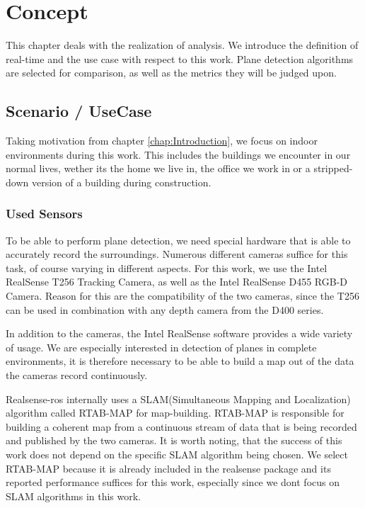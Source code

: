 \documentclass[main.tex]{subfiles}
\begin{document}
\chapter{Concept} \label{chap:Concept}


This chapter deals with the realization of analysis.
We introduce the definition of real-time and the use case with respect to this work.
Plane detection algorithms are selected for comparison, as well as the metrics they will be judged upon.

\section{Scenario / UseCase}
Taking motivation from chapter \ref{chap:Introduction}, we focus on indoor environments during this work.
This includes the buildings we encounter in our normal lives, wether its the home we live in, the office we work in or a stripped-down
version of a building during construction.


\subsection{Used Sensors}
To be able to perform plane detection, we need special hardware that is able to accurately record the surroundings.
Numerous different cameras suffice for this task, of course varying in different aspects.
For this work, we use the Intel RealSense T256 Tracking Camera, as well as the Intel RealSense D455 RGB-D Camera.
Reason for this are the compatibility of the two cameras, since the T256 can be used in combination with any depth camera from the D400 series.

In addition to the cameras, the Intel RealSense software provides a wide variety of usage. We are especially interested in detection of planes
in complete environments, it is therefore necessary to be able to build a map out of the data the cameras record continuously.


Realsense-ros internally uses a SLAM(Simultaneous Mapping and Localization) algorithm called RTAB-MAP \cite{Labbé_Michaud_2019} for map-building.
RTAB-MAP is responsible for building a coherent map from a continuous stream of data that is being recorded and published by the two cameras.
It is worth noting, that the success of this work does not depend on the specific SLAM algorithm being chosen. We select RTAB-MAP because
it is already included in the realsense package and its reported performance suffices for this work, especially since we dont focus on SLAM
algorithms in this work.
\end{document}
